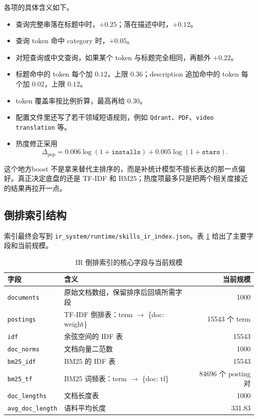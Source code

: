 各项的具体含义如下。
\begin{itemize}
  \item 查询完整串落在标题中时，$+0.25$；落在描述中时，$+0.12$。
  \item 查询 token 命中 category 时，$+0.05$。
  \item 对短查询或中文查询，如果某个 token 与标题完全相同，再额外 $+0.22$。
  \item 标题命中的 token 每个加 $0.12$，上限 $0.36$；description 追加命中的 token 每个加 $0.02$，上限 $0.12$。
  \item token 覆盖率按比例折算，最高再给 $0.30$。
  \item 配置文件里还写了若干领域短语规则，例如 \texttt{Qdrant}、\texttt{PDF}、\texttt{video translation} 等。
  \item 热度修正采用
  \begin{equation}
  \label{eq:popularity}
  \Delta_{\text{pop}}=
  0.006\log (1+\texttt{installs})+
  0.005\log (1+\texttt{stars}).
  \end{equation}
\end{itemize}

这个地方boost 不是拿来替代主排序的，而是补统计模型不擅长表达的那一点偏好。真正决定底盘的还是 TF-IDF 和 BM25；热度项最多只是把两个相关度接近的结果再拉开一点。

\subsection{倒排索引结构}
索引最终会写到 \texttt{ir\_system/runtime/skills\_ir\_index.json}。表 \ref{tab:index-structure} 给出了主要字段和当前规模。

\begin{table}[H]
\centering
\caption{IR 倒排索引的核心字段与当前规模}
\label{tab:index-structure}
\begin{tabular}{p{3.2cm}p{7.1cm}r}
\toprule
字段 & 含义 & 当前规模 \\
\midrule
\texttt{documents} & 原始文档数组，保留排序后回填所需字段 & 1000 \\
\texttt{postings} & TF-IDF 倒排表：term $\rightarrow$ \{doc: weight\} & 15543 个 term \\
\texttt{idf} & 余弦空间的 IDF 表 & 15543 \\
\texttt{doc\_norms} & 文档向量二范数 & 1000 \\
\texttt{bm25\_idf} & BM25 的 IDF 表 & 15543 \\
\texttt{bm25\_tf} & BM25 词频表：term $\rightarrow$ \{doc: tf\} & 84696 个 posting 对 \\
\texttt{doc\_lengths} & 文档长度表 & 1000 \\
\texttt{avg\_doc\_length} & 语料平均长度 & 331.83 \\
\bottomrule
\end{tabular}
\end{table}

